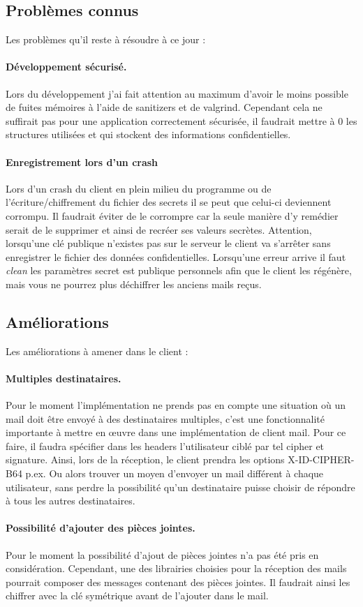 \subsection{Problèmes connus}
Les problèmes qu'il reste à résoudre à ce jour :
\paragraph*{Développement sécurisé.}
Lors du développement j'ai fait attention au maximum d'avoir le moins possible de fuites mémoires à l'aide de sanitizers et de valgrind. Cependant cela ne suffirait pas pour une application correctement sécurisée, il faudrait mettre à 0 les structures utilisées et qui stockent des informations confidentielles.
\paragraph*{Enregistrement lors d'un crash}
Lors d'un crash du client en plein milieu du programme ou de l'écriture/chiffrement du fichier des secrets il se peut que celui-ci deviennent corrompu. Il faudrait éviter de le corrompre car la seule manière d'y remédier serait de le supprimer et ainsi de recréer ses valeurs secrètes. Attention, lorsqu'une clé publique n'existes pas sur le serveur le client va s'arrêter sans enregistrer le fichier des données confidentielles. Lorsqu'une erreur arrive il faut \textit{clean} les paramètres secret est publique personnels afin que le client les régénère, mais vous ne pourrez plus déchiffrer les anciens mails reçus.
\subsection{Améliorations}
Les améliorations à amener dans le client :
\paragraph*{Multiples destinataires.}
Pour le moment l'implémentation ne prends pas en compte une situation où un mail doit être envoyé à des destinataires multiples, c'est une fonctionnalité importante à mettre en œuvre dans une implémentation de client mail. Pour ce faire, il faudra spécifier dans les headers l'utilisateur ciblé par tel cipher et signature. Ainsi, lors de la réception, le client prendra les options X-ID-CIPHER-B64 p.ex. Ou alors trouver un moyen d'envoyer un mail différent à chaque utilisateur, sans perdre la possibilité qu'un destinataire puisse choisir de répondre à tous les autres destinataires.
\paragraph*{Possibilité d'ajouter des pièces jointes.}
Pour le moment la possibilité d'ajout de pièces jointes n'a pas été pris en considération. Cependant, une des librairies choisies pour la réception des mails pourrait composer des messages contenant des pièces jointes. Il faudrait ainsi les chiffrer avec la clé symétrique avant de l'ajouter dans le mail.
